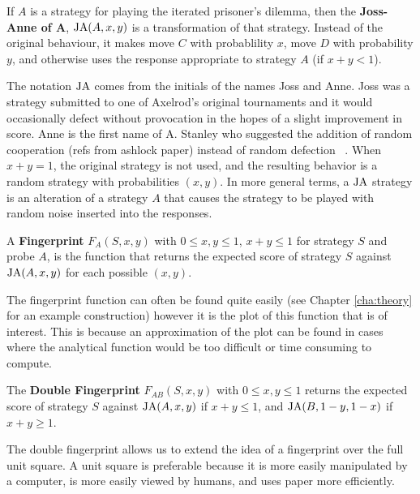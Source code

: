\begin{definition}\label{def:joss-ann}
If $A$ is a strategy for playing the iterated prisoner's dilemma, then the \textbf{Joss-Anne of A}, $\text{JA}(A, x, y)$ is a transformation of that strategy.
Instead of the original behaviour, it makes move $C$ with probablility $x$, move $D$ with probability $y$, and otherwise uses the response appropriate to strategy $A$ (if $x+y < 1$).
\end{definition}

The notation $\text{JA}$ comes from the initials of the names Joss and Anne.
Joss was a strategy submitted to one of Axelrod’s original tournaments and it would occasionally defect without provocation in the hopes of a slight improvement in score.
Anne is the first name of A. Stanley who suggested the addition of random cooperation (refs from ashlock paper) instead of random defection ~\cite{Ashlock2008}.
When $x + y = 1$, the original strategy is not used, and the resulting behavior is a random strategy with probabilities $(x, y)$.
In more general terms, a $\text{JA}$ strategy is an alteration of a strategy $A$ that causes the strategy to be played with random noise inserted into the responses.

\begin{definition}\label{def:fingerprint}
A \textbf{Fingerprint} $F_A(S, x, y)$ with $0 \leq x, y \leq 1$, $x+y \leq 1$ for strategy $S$ and probe $A$, is the function that returns the expected score of strategy $S$ against $\text{JA}(A, x, y)$ for each possible $(x, y)$.
\end{definition}

The fingerprint function can often be found quite easily (see Chapter \ref{cha:theory} for an example construction) however it is the plot of this function that is of interest.
This is because an approximation of the plot can be found in cases where the analytical function would be too difficult or time consuming to compute.

\begin{definition}\label{def:double-fingerprint}
The \textbf{Double Fingerprint} $F_{AB}(S, x, y)$ with $0 \leq x, y \leq 1$ returns the expected score of strategy $S$ against $\text{JA}(A, x, y)$ if $x+y \leq 1$, and $\text{JA}(B, 1-y, 1-x)$ if $x+y \geq 1$.
\end{definition}

The double fingerprint allows us to extend the idea of a fingerprint over the full unit square.
A unit square is preferable because it is more easily manipulated by a computer, is more easily viewed by humans, and uses paper more efficiently. %

